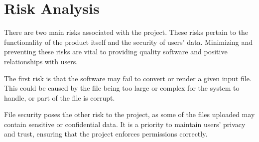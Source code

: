 
\section{Risk Analysis}
There are two main risks associated with the project. These risks pertain to the functionality of the product itself and the security of users' data.
Minimizing and preventing these risks are vital to providing quality software and positive relationships with users.

The first risk is that the software may fail to convert or render a given input file.
This could be caused by the file being too large or complex for the system to handle, or part of the file is corrupt. 

File security poses the other risk to the project, as some of the files uploaded may contain sensitive or confidential data.
It is a priority to maintain users' privacy and trust, ensuring that the project enforces permissions correctly.